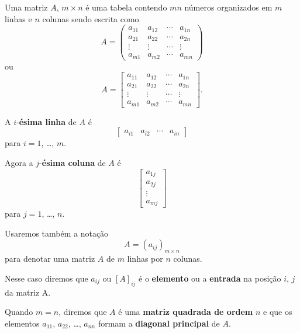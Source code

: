 \documentclass{beamer}
\begin{document}
    \begin{frame}
      \begin{definicao}
        Uma matriz $A$, $m \times n$ é uma tabela contendo $mn$ números organizados em $m$ linhas e $n$ colunas sendo escrita como
        \begin{displaymath}
         A = \begin{pmatrix}
           a_{11} & a_{12} & \cdots & a_{1n}\\
           a_{21} & a_{22} & \cdots & a_{2n}\\
           \vdots & \vdots & \cdots & \vdots\\
           a_{m1} & a_{m2} & \cdots & a_{mn}
         \end{pmatrix}\end{displaymath}
         ou
        \begin{displaymath}
          A = \begin{bmatrix}
            a_{11} & a_{12} & \cdots & a_{1n}\\
            a_{21} & a_{22} & \cdots & a_{2n}\\
            \vdots & \vdots & \cdots & \vdots\\
            a_{m1} & a_{m2} & \cdots & a_{mn}
          \end{bmatrix}.
        \end{displaymath}
        
      \end{definicao}
    \end{frame}

    \begin{frame}
      A $i$-\textbf{ésima linha} de $A$ é
      \[
        \begin{bmatrix} a_{i1} & a_{i2} & \cdots & a_{in} \end{bmatrix}
      \]
      para $i = 1$, \dots, $m$.

      Agora a $j$-\textbf{ésima coluna} de $A$ é
      \[
        \begin{bmatrix}
          a_{1j}\\
          a_{2j}\\
          \vdots\\
          a_{mj}
        \end{bmatrix}
      \]
      para $j=1$, \dots, $n$.
    \end{frame}

    \begin{frame}
      Usaremos também a notação
      \[
        A = (a_{ij})_{m \times n}
      \]
      para denotar uma matriz $A$ de $m$ linhas por $n$ colunas. 

      Nesse caso diremos que $a_{ij}$ ou $[A]_{ij}$ é o \textbf{elemento} ou a \textbf{entrada} na posição $i$, $j$ da matriz A.

      Quando $m = n$, diremos que $A$ é uma \textbf{matriz quadrada de ordem} $n$ e que os elementos $a_{11}$, $a_{22}$, \dots, $a_{nn}$ 
      formam a \textbf{diagonal principal} de $A$.
    \end{frame}
\end{document}

